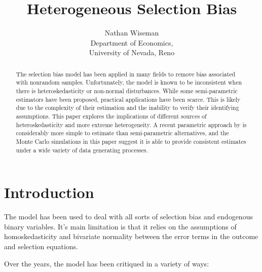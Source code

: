 \documentclass{article}
\begin{document}
\title{Heterogeneous Selection Bias}
\author{Nathan Wiseman \\Department of Economics,\\University of Nevada, Reno}
\maketitle
\begin{abstract}
The \citet{heckman1979} selection bias model has been applied in many fields to remove bias associated with nonrandom samples.  Unfortunately, the model is known to be inconsistent when there is heteroskedasticity or non-normal disturbances.  While some semi-parametric estimators have been proposed, practical applications have been scarce.  This is likely due to the complexity of their estimation and the inability to verify their identifying assumptions. This paper explores the implications of different sources of heteroskedasticity and more extreme heterogeneity.  A recent parametric approach by \citet{reichert2014} is considerably more simple to estimate than semi-parametric alternatives, and the Monte Carlo simulations in this paper suggest it is able to provide consistent estimates under a wide variety of data generating processes.

\end{abstract}
\newpage


\section{Introduction}
The \citet{heckman1979} model has been used to deal with all sorts of selection bias and endogenous binary variables.  It's main limitation is that it relies on the assumptions of homoskedasticity and bivariate normality between the error terms in the outcome and selection equations.  

Over the years, the \citet{heckman1979} model has been critiqued in a variety of ways:
\end{document}
